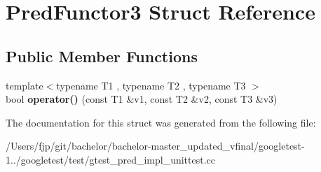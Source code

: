 \hypertarget{struct_pred_functor3}{}\section{Pred\+Functor3 Struct Reference}
\label{struct_pred_functor3}
\subsection*{Public Member Functions}
\begin{DoxyCompactItemize}
\item 
\mbox{\label{struct_pred_functor3_a08b0c59189570fb8eb7e2c7452fec995}} 
{\footnotesize template$<$typename T1 , typename T2 , typename T3 $>$ }\\bool {\bfseries operator()} (const T1 \&v1, const T2 \&v2, const T3 \&v3)
\end{DoxyCompactItemize}


The documentation for this struct was generated from the following file\+:\begin{DoxyCompactItemize}
\item 
/\+Users/fjp/git/bachelor/bachelor-\/master\+\_\+updated\+\_\+vfinal/googletest-\/1../googletest/test/gtest\+\_\+pred\+\_\+impl\+\_\+unittest.\+cc\end{DoxyCompactItemize}
